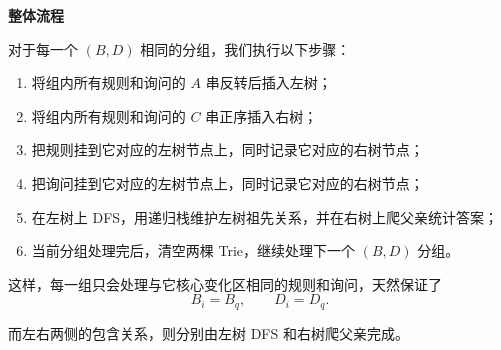 \documentclass{book}
\begin{document}
\par\medskip
\noindent\textbf{整体流程}
\par\medskip

对于每一个 $(B,D)$ 相同的分组，我们执行以下步骤：

\begin{enumerate}[leftmargin=2em,itemsep=2pt,topsep=2pt,parsep=0pt,partopsep=0pt]
    \item 将组内所有规则和询问的 $A$ 串反转后插入左树；
    \item 将组内所有规则和询问的 $C$ 串正序插入右树；
    \item 把规则挂到它对应的左树节点上，同时记录它对应的右树节点；
    \item 把询问挂到它对应的左树节点上，同时记录它对应的右树节点；
    \item 在左树上 DFS，用递归栈维护左树祖先关系，并在右树上爬父亲统计答案；
    \item 当前分组处理完后，清空两棵 Trie，继续处理下一个 $(B,D)$ 分组。
\end{enumerate}

这样，每一组只会处理与它核心变化区相同的规则和询问，天然保证了
\[
B_i=B_q,\qquad D_i=D_q.
\]

而左右两侧的包含关系，则分别由左树 DFS 和右树爬父亲完成。
\newpage
\end{document}
